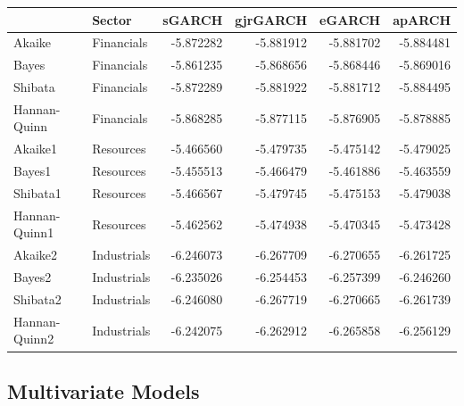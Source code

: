 \documentclass[11pt,preprint, authoryear]{elsarticle}
\let\origtable\table
\let\endorigtable\endtable
\renewenvironment{table}[1][2] {
    \expandafter\origtable\expandafter[H]
} {
    \endorigtable
}
\numberwithin{equation}{section}
\numberwithin{figure}{section}
\numberwithin{table}{section}
\begin{document}
\begin{table}

\caption{\label{tab:unnamed-chunk-6}GARCH Model Comparison Results}
\centering
\begin{tabular}[t]{l|l|r|r|r|r}
\hline
  & Sector & sGARCH & gjrGARCH & eGARCH & apARCH\\
\hline
Akaike & Financials & -5.872282 & -5.881912 & -5.881702 & -5.884481\\
\hline
Bayes & Financials & -5.861235 & -5.868656 & -5.868446 & -5.869016\\
\hline
Shibata & Financials & -5.872289 & -5.881922 & -5.881712 & -5.884495\\
\hline
Hannan-Quinn & Financials & -5.868285 & -5.877115 & -5.876905 & -5.878885\\
\hline
Akaike1 & Resources & -5.466560 & -5.479735 & -5.475142 & -5.479025\\
\hline
Bayes1 & Resources & -5.455513 & -5.466479 & -5.461886 & -5.463559\\
\hline
Shibata1 & Resources & -5.466567 & -5.479745 & -5.475153 & -5.479038\\
\hline
Hannan-Quinn1 & Resources & -5.462562 & -5.474938 & -5.470345 & -5.473428\\
\hline
Akaike2 & Industrials & -6.246073 & -6.267709 & -6.270655 & -6.261725\\
\hline
Bayes2 & Industrials & -6.235026 & -6.254453 & -6.257399 & -6.246260\\
\hline
Shibata2 & Industrials & -6.246080 & -6.267719 & -6.270665 & -6.261739\\
\hline
Hannan-Quinn2 & Industrials & -6.242075 & -6.262912 & -6.265858 & -6.256129\\
\hline
\end{tabular}
\end{table}

\hypertarget{multivariate-models}{%
\subsection{Multivariate Models}\label{multivariate-models}}
\end{document}
